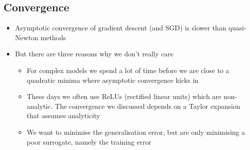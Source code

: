 
\begin{slide}
\section{Convergence}

\begin{PauseHighLight}
  \begin{itemize}
  \item Asymptotic convergence of gradient descent (and SGD) is slower
    than quasi-Newton methods\pause
  \item But there are three reasons why we don't really care\pause
    \begin{itemize}
    \item For complex models we spend a lot of time before we are
      close to a quadratic minima where asymptotic convergence kicks
      in\pause
    \item These days we often use ReLUs (rectified linear units) which
      are non-analytic.  The convergence we discussed depends on a
      Taylor expansion that assumes analyticity\pause
    \item We want to minimise the generalisation error, but are only
      minimising a poor surrogate, namely the training error\pause
    \end{itemize}
        
  \end{itemize}
\end{PauseHighLight}

\end{slide}



\Outline %

